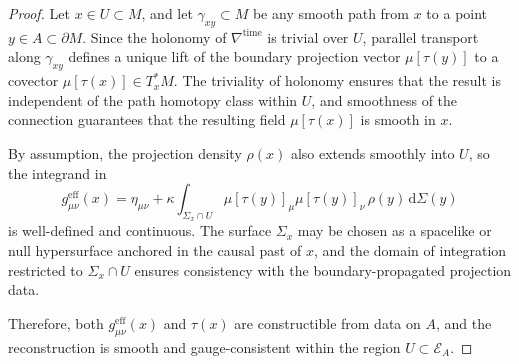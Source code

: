 \documentclass[11pt]{article}
\begin{document}
\begin{proof}
Let \( x \in U \subset M \), and let \( \gamma_{xy} \subset M \) be any smooth path from \( x \) to a point \( y \in A \subset \partial M \). Since the holonomy of \( \nabla^{\mathrm{time}} \) is trivial over \( U \), parallel transport along \( \gamma_{xy} \) defines a unique lift of the boundary projection vector \( \mu[\tau(y)] \) to a covector \( \mu[\tau(x)] \in T^*_x M \). The triviality of holonomy ensures that the result is independent of the path homotopy class within \( U \), and smoothness of the connection guarantees that the resulting field \( \mu[\tau(x)] \) is smooth in \( x \).

By assumption, the projection density \( \rho(x) \) also extends smoothly into \( U \), so the integrand in
\[
g^{\mathrm{eff}}_{\mu\nu}(x) = \eta_{\mu\nu} + \kappa \int_{\Sigma_x \cap U} \mu[\tau(y)]_\mu \mu[\tau(y)]_\nu \, \rho(y) \, \mathrm{d}\Sigma(y)
\]
is well-defined and continuous. The surface \( \Sigma_x \) may be chosen as a spacelike or null hypersurface anchored in the causal past of \( x \), and the domain of integration restricted to \( \Sigma_x \cap U \) ensures consistency with the boundary-propagated projection data.

Therefore, both \( g^{\mathrm{eff}}_{\mu\nu}(x) \) and \( \tau(x) \) are constructible from data on \( A \), and the reconstruction is smooth and gauge-consistent within the region \( U \subset \mathcal{E}_A \).
\end{proof}
\end{document}
